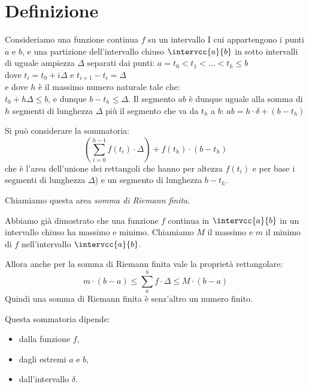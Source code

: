 \section{Definizione}
\label{sec:integrali_definizione}

\begin{minipage}{.49\textwidth}
\begin{inaccessibleblock} 
Consideriamo una funzione continua \(f\) su un intervallo I cui 
appartengono i punti \(a\) e \(b\), e una partizione dell'intervallo chiuso 
\(\intervcc{a}{b}\) in sotto intervalli di uguale ampiezza \(\Delta\) 
separati dai punti: 
\(a = t_0 < t_1 < \dots < t_h \le b\) \\
dove \(t_i = t_0 +i \Delta\) \quad e \quad \(t_{i+1} - t_i= \Delta\) \\
e dove \(h\) è il massimo numero naturale tale che: \\
\(t_0 + h \Delta \le b\), e dunque \(b-t_h \le \Delta\). 
Il segmento \(ab\) è dunque uguale alla somma di \(h\) segmenti di lunghezza 
\(\Delta\) più il segmento che va da \(t_h\) a \(b\):
\(ab = h \cdot \delta + (b - t_h)\)
\end{inaccessibleblock}
\end{minipage}
\hfill
\begin{minipage}{.49\textwidth}
\begin{inaccessibleblock} 
  \sommariemann
\end{inaccessibleblock}
\end{minipage}

Si può considerare la sommatoria:
\[\left(\sum_{i=0}^{h-1} f(t_i)\cdot\Delta \right)+f(t_h)\cdot(b-t_h)\] 
che è l'area dell'unione dei rettangoli che 
hanno per altezza \(f(t_i)\) 
e per base i segmenti di lunghezza \(\Delta\)) e un segmento di lunghezza \(b 
- t_{h}\). 

Chiamiamo questa area \emph{somma di Riemann finita}.

Abbiamo già dimostrato che una funzione \(f\) continua in 
\(\intervcc{a}{b}\) in un intervallo chiuso ha massimo e minimo. 
Chiamiamo \(M\) il massimo e \(m\) il minimo di \(f\) nell'intervallo 
\(\intervcc{a}{b}\).

Allora anche per la somma di Riemann finita vale la proprietà rettangolare: 
\[m\cdot(b - a) \le \sum_a^b f \cdot\Delta \le M\cdot(b - a)\] 
Quindi una somma di Riemann finita è senz'altro un numero finito.

Questa sommatoria dipende:
\begin{itemize} [nosep]
 \item dalla funzione \(f\),
 \item dagli estremi \(a\) e \(b\),
 \item dall'intervallo \(\delta\).
\end{itemize}

